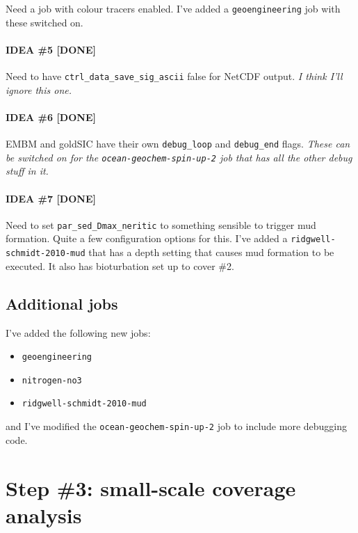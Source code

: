 \documentclass[a4paper,10pt,article]{memoir}
\begin{document}
Need a job with colour tracers enabled.  I've added a
\texttt{geoengineering} job with these switched on.

\subsubsection*{IDEA \#5 [DONE]}

Need to have \texttt{ctrl\_data\_save\_sig\_ascii} false for NetCDF
output.  \emph{I think I'll ignore this one.}

\subsubsection*{IDEA \#6 [DONE]}

EMBM and goldSIC have their own \texttt{debug\_loop} and
\texttt{debug\_end} flags.  \emph{These can be switched on for the
  \texttt{ocean-geochem-spin-up-2} job that has all the other debug
  stuff in it.}

\subsubsection*{IDEA \#7 [DONE]}

Need to set \texttt{par\_sed\_Dmax\_neritic} to something sensible to
trigger mud formation.  Quite a few configuration options for this.
I've added a \texttt{ridgwell-schmidt-2010-mud} that has a depth
setting that causes mud formation to be executed.  It also has
bioturbation set up to cover \#2.


\section{Additional jobs}

I've added the following new jobs:
\begin{itemize}
  \setlength\itemsep{0pt}
  \item{\texttt{geoengineering}}
  \item{\texttt{nitrogen-no3}}
  \item{\texttt{ridgwell-schmidt-2010-mud}}
\end{itemize}
and I've modified the \texttt{ocean-geochem-spin-up-2} job to include
more debugging code.


\chapter{Step \#3: small-scale coverage analysis}
\end{document}
